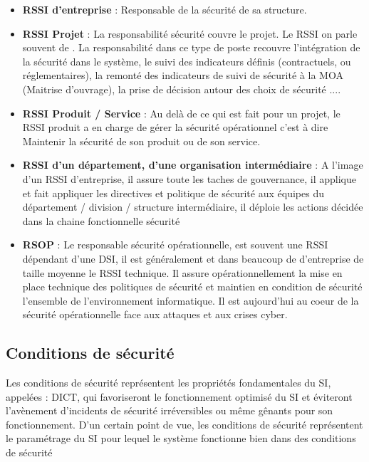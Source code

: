 \begin{itemize}
\item \textbf{RSSI d'entreprise} : Responsable de la sécurité de sa structure.
	\item \textbf{RSSI Projet} : La responsabilité sécurité couvre le projet. Le RSSI on parle souvent de . La responsabilité dans ce type de poste recouvre l'intégration de la sécurité dans le système, le suivi des indicateurs définis (contractuels, ou réglementaires), la remonté des indicateurs de suivi de sécurité à la MOA (Maitrise d'ouvrage), la prise de décision autour des choix de sécurité ....
	\item \textbf{RSSI Produit / Service} : Au delà de ce qui est fait pour un projet, le RSSI produit a en charge de gérer la sécurité opérationnel c'est à dire Maintenir la sécurité de son produit ou de son service.
 \item \textbf{RSSI d'un département, d'une organisation intermédiaire} : A l'image d'un RSSI d'entreprise, il assure toute les taches de gouvernance, il applique et fait appliquer les directives et politique de sécurité aux équipes du département / division / structure intermédiaire, il déploie les actions décidée dans la chaine fonctionnelle sécurité
 \item \textbf{RSOP} : Le responsable sécurité opérationnelle, est souvent une RSSI dépendant d'une DSI, il est généralement et dans beaucoup de d'entreprise de taille moyenne le RSSI technique. Il assure opérationnellement la mise en place technique des politiques de sécurité et maintien en condition de sécurité l'ensemble de l'environnement informatique. Il est aujourd'hui au coeur de la sécurité opérationnelle face aux attaques et aux crises cyber.
\end{itemize}


\subsection{Conditions de sécurité}

Les conditions de sécurité représentent les propriétés fondamentales du SI, appelées : DICT, qui favoriseront le fonctionnement optimisé du SI et éviteront l'avènement d'incidents de sécurité irréversibles ou même gênants pour son fonctionnement. D'un certain point de vue, les conditions de sécurité représentent le paramétrage du SI pour lequel le système fonctionne bien dans des conditions de sécurité 

